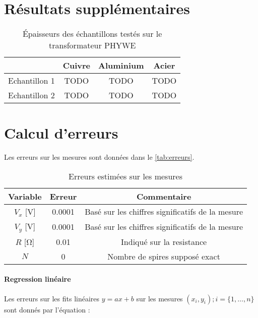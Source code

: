 \section{Résultats supplémentaires}
\label{sec:resultats_bonus}

\begin{table}[h]
    \centering
    \begin{tabulary}{\linewidth}{c c c c}
        \toprule
         & Cuivre & Aluminium & Acier \\
        \midrule
        Echantillon 1 & TODO & TODO & TODO \\
        Echantillon 2 & TODO & TODO & TODO \\
        \bottomrule
    \end{tabulary}
    \caption{Épaisseurs des échantillons testés sur le transformateur PHYWE}
    \label{tab:thiccness}
\end{table}


\section{Calcul d'erreurs}
\label{sec:erreurs}

Les erreurs sur les mesures sont données dans le \autoref{tab:erreurs}.

\begin{table}[h]
    \centering
    \begin{tabulary}{\textwidth}{C C C}
        \toprule
        Variable & Erreur & Commentaire \\
        \midrule
        \(V_x\) [\si{\volt}] & 0.0001 & Basé sur les chiffres significatifs de la mesure \\
        \(V_y\) [\si{\volt}] & 0.0001 & Basé sur les chiffres significatifs de la mesure \\
        \(R\) [\si{\ohm}] & 0.01 & Indiqué sur la resistance \\
        \(N\) & 0 & Nombre de spires supposé exact \\
        \bottomrule
    \end{tabulary}
    \caption{Erreurs estimées sur les mesures}
    \label{tab:erreurs}
\end{table}

\paragraph*{Regression linéaire}
Les erreurs sur les fits linéaires \(y = ax + b\) sur les mesures \((x_i, y_i) ; i = \{1, \hdots, n\}\) sont donnés par l'équation \cite{erreursmesure}:

